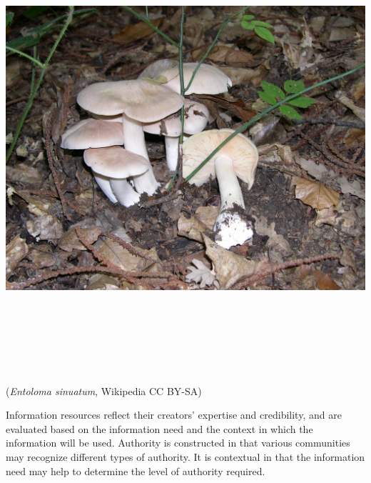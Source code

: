 \documentclass[17pt]{extarticle}
\begin{document}
{{\begin{center}
  \includegraphics[height=6.5in]{images/entoloma-sinuatum.jpg}

  {\tiny (\textit{Entoloma sinuatum}, Wikipedia CC BY-SA)}
\end{center}

\newpage


{\Huge

  \begin{center}

    Information resources reflect their creators’ expertise and credibility, and are evaluated based on the information need and the context in which the information will be used. Authority is constructed in that various communities may recognize different types of authority. It is contextual in that the information need may help to determine the level of authority required.

\end{center}

}

}}
\end{document}
